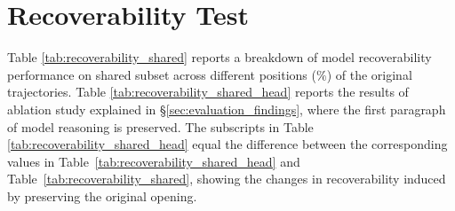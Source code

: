 \documentclass{article} %
\begin{document}
\newpage



\section{Recoverability Test}
Table \ref{tab:recoverability_shared} reports a breakdown of model recoverability performance on shared subset across different positions ($\%$) of the original trajectories. Table \ref{tab:recoverability_shared_head} reports the results of ablation study explained in \S \ref{sec:evaluation_findings}, where the first paragraph of model reasoning is preserved. The subscripts in Table \ref{tab:recoverability_shared_head} equal the difference between the corresponding values in Table~\ref{tab:recoverability_shared_head} and Table~\ref{tab:recoverability_shared}, showing the changes in recoverability induced by preserving the original opening.
\end{document}
